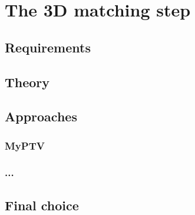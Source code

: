 \chapter{The 3D matching step}
\label{chap:matching}

\section{Requirements}
\section{Theory}
\section{Approaches}
\subsection{MyPTV}
\subsection{...}
\section{Final choice}
